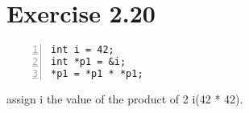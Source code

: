 \documentclass{article}
\begin{document}
\section*{Exercise 2.20}

\begin{lstlisting}[basicstyle=\ttfamily, numbers=left, xleftmargin=2em]
int i = 42; 
int *p1 = &i; 
*p1 = *p1 * *p1;
\end{lstlisting}

\begin{flushleft}
assign i the value of the product of 2 i(42 * 42).
\end{flushleft}
\end{document}
